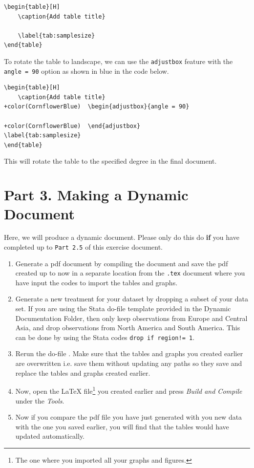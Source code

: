 \documentclass[12pts]{report}
\begin{document}
\begin{Verbatim}
\begin{table}[H]
	\caption{Add table title}
	
	\label{tab:samplesize}
\end{table}
\end{Verbatim}
To rotate the table to landscape, we can use the \texttt{adjustbox} feature with the \texttt{angle = 90} option as shown in blue in the code below.
\begin{Verbatim}[commandchars=+\(\)]
\begin{table}[H]
	\caption{Add table title}
+color(CornflowerBlue)	\begin{adjustbox}{angle = 90} 
		
+color(CornflowerBlue)	\end{adjustbox}
\label{tab:samplesize}
\end{table}
\end{Verbatim}

This will rotate the table to the specified degree in the final document. 

\section*{Part 3. Making a Dynamic Document}

Here, we will produce a dynamic document. Please only do this do \textbf{if} you have completed up to \texttt{Part 2.5} of this exercise document. 

\begin{enumerate}
	\item Generate a pdf document by compiling the document and save the pdf created up to now in a separate location from the \texttt{.tex} document where you have input the codes to import the tables and graphs. 
	\item Generate a new treatment for your dataset by dropping a subset of your data set. 
	\subitem If you are using the Stata do-file template provided in the Dynamic Documentation Folder, then only keep observations from Europe and Central Asia, and drop observations from North America and South America. This can be done by using the Stata codes \texttt{drop if region!= 1}. 
	\item Rerun the do-file . Make sure that the tables and graphs you created earlier are overwritten i.e. save them without updating any paths so they save and replace the tables and graphs created earlier. 
	\item Now, open the {\LaTeX} file\footnote{The one where you imported all your graphs and figures.} you created earlier and press \textit{Build and Compile} under the \textit{Tools}.
	\item Now if you compare the pdf file you have just generated with you new data with the one you saved earlier, you will find that the tables would have updated automatically. 
\end{enumerate}
\end{document}
